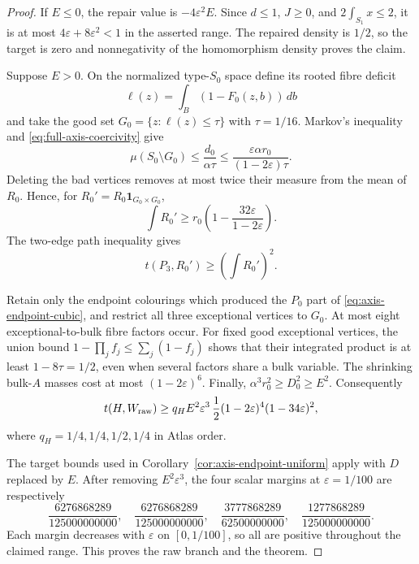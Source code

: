 \documentclass[11pt]{article}
\begin{document}
\begin{proof}
If $E\leq0$, the repair value is $-4\varepsilon^2E$.  Since
$d\leq1$, $J\geq0$, and $2\int_{S_1}x\leq2$, it is at most
$4\varepsilon+8\varepsilon^2<1$ in the asserted range.  The repaired
density is $1/2$, so the target is zero and nonnegativity of the homomorphism
density proves the claim.

Suppose $E>0$.  On the normalized type-$S_0$ space define its rooted fibre
deficit
\[
 \ell(z)=\int_B(1-F_0(z,b))\,db
\]
and take the good set $G_0=\{z:\ell(z)\leq\tau\}$ with
$\tau=1/16$.  Markov's inequality and
\eqref{eq:full-axis-coercivity} give
\[
 \mu(S_0\setminus G_0)
 \leq\frac{d_0}{\alpha\tau}
 \leq\frac{\varepsilon\alpha r_0}
              {(1-2\varepsilon)\tau}.
\]
Deleting the bad vertices removes at most twice their measure from the mean
of $R_0$.  Hence, for
$R_0'=R_0\mathbf1_{G_0\times G_0}$,
\[
 \int R_0'
 \geq r_0\left(1-\frac{32\varepsilon}{1-2\varepsilon}\right).
\]
The two-edge path inequality gives
\[
 t(P_3,R_0')\geq\left(\int R_0'\right)^2.
\]

Retain only the endpoint colourings which produced the $P_0$ part of
\eqref{eq:axis-endpoint-cubic}, and restrict all three exceptional vertices
to $G_0$.  At most eight exceptional-to-bulk fibre factors occur.  For fixed
good exceptional vertices, the union bound
$1-\prod_jf_j\leq\sum_j(1-f_j)$ shows that their integrated product is at
least $1-8\tau=1/2$, even when several factors share a bulk variable.  The
shrinking bulk-$A$ masses cost at most $(1-2\varepsilon)^6$.  Finally,
$\alpha^3r_0^2\geq D_0^2\geq E^2$.  Consequently
\begin{equation}
 t(H,W_{\rm raw})
 \geq q_HE^2\varepsilon^3\,
 \frac12(1-2\varepsilon)^4(1-34\varepsilon)^2,
 \label{eq:full-axis-positive-subintegral}
\end{equation}
where $q_H=1/4,1/4,1/2,1/4$ in Atlas order.

The target bounds used in Corollary~\ref{cor:axis-endpoint-uniform} apply
with $D$ replaced by $E$.  After removing $E^2\varepsilon^3$, the four
scalar margins at $\varepsilon=1/100$ are respectively
\[
 \frac{6276868289}{125000000000},\quad
 \frac{6276868289}{125000000000},\quad
 \frac{3777868289}{62500000000},\quad
 \frac{1277868289}{125000000000}.
\]
Each margin decreases with $\varepsilon$ on $[0,1/100]$, so all are
positive throughout the claimed range.  This proves the raw branch and the
theorem.
\end{proof}
\end{document}
